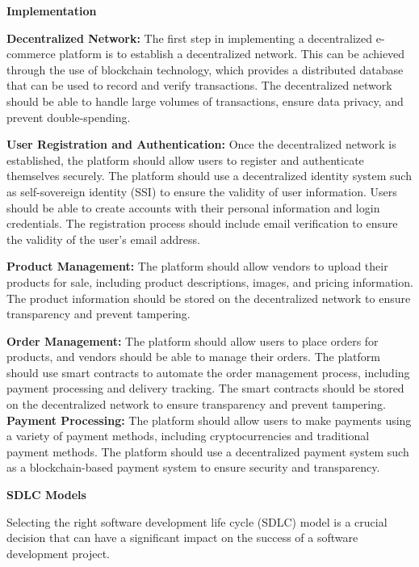 \documentclass[a4paper,11pt]{article}
\begin{document}
\begin{center}
\newpage


\begin{center}
    \textbf{\Large Implementation}
    \vspace{1cm}
\end{center}
   \textbf{Decentralized Network:} 
The first step in implementing a decentralized e-commerce platform is to establish a decentralized network. This can be achieved through the use of blockchain technology, which provides a distributed database that can be used to record and verify transactions. The decentralized network should be able to handle large volumes of transactions, ensure data privacy, and prevent double-spending.

\textbf{User Registration and Authentication:}
Once the decentralized network is established, the platform should allow users to register and authenticate themselves securely. The platform should use a decentralized identity system such as self-sovereign identity (SSI) to ensure the validity of user information. Users should be able to create accounts with their personal information and login credentials. The registration process should include email verification to ensure the validity of the user's email address.

\textbf{Product Management:}
The platform should allow vendors to upload their products for sale, including product descriptions, images, and pricing information. The product information should be stored on the decentralized network to ensure transparency and prevent tampering.

\textbf{Order Management:}
The platform should allow users to place orders for products, and vendors should be able to manage their orders. The platform should use smart contracts to automate the order management process, including payment processing and delivery tracking. The smart contracts should be stored on the decentralized network to ensure transparency and prevent tampering.\\


\textbf{Payment Processing:}
The platform should allow users to make payments using a variety of payment methods, including cryptocurrencies and traditional payment methods. The platform should use a decentralized payment system such as a blockchain-based payment system to ensure security and transparency.


\vspace{1cm}

\textbf{SDLC Models}

Selecting the right software development life cycle (SDLC) model is a crucial decision that can have a significant impact on the success of a software development project.


\end{center}
\end{document}
